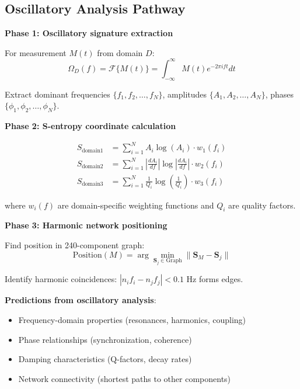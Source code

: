\documentclass[12pt,a4paper]{article}
\begin{document}
\subsection{Oscillatory Analysis Pathway}

\textbf{Phase 1: Oscillatory signature extraction}

For measurement $M(t)$ from domain $D$:
\begin{equation}
\Omega_D(f) = \mathcal{F}\{M(t)\} = \int_{-\infty}^{\infty} M(t) e^{-2\pi ift} dt
\end{equation}

Extract dominant frequencies $\{f_1, f_2, \ldots, f_N\}$, amplitudes $\{A_1, A_2, \ldots, A_N\}$, phases $\{\phi_1, \phi_2, \ldots, \phi_N\}$.

\textbf{Phase 2: S-entropy coordinate calculation}

\begin{align}
S_{\text{domain1}} &= \sum_{i=1}^{N} A_i \log(A_i) \cdot w_1(f_i) \\
S_{\text{domain2}} &= \sum_{i=1}^{N} \left|\frac{dA_i}{df}\right| \log\left|\frac{dA_i}{df}\right| \cdot w_2(f_i) \\
S_{\text{domain3}} &= \sum_{i=1}^{N} \frac{1}{Q_i} \log\left(\frac{1}{Q_i}\right) \cdot w_3(f_i)
\end{align}

where $w_i(f)$ are domain-specific weighting functions and $Q_i$ are quality factors.

\textbf{Phase 3: Harmonic network positioning}

Find position in 240-component graph:
\begin{equation}
\text{Position}(M) = \arg\min_{\mathbf{S}_j \in \text{Graph}} \|\mathbf{S}_M - \mathbf{S}_j\|
\end{equation}

Identify harmonic coincidences: $|n_i f_i - n_j f_j| < 0.1$ Hz forms edges.

\textbf{Predictions from oscillatory analysis}:
\begin{itemize}
\item Frequency-domain properties (resonances, harmonics, coupling)
\item Phase relationships (synchronization, coherence)
\item Damping characteristics (Q-factors, decay rates)
\item Network connectivity (shortest paths to other components)
\end{itemize}
\end{document}
